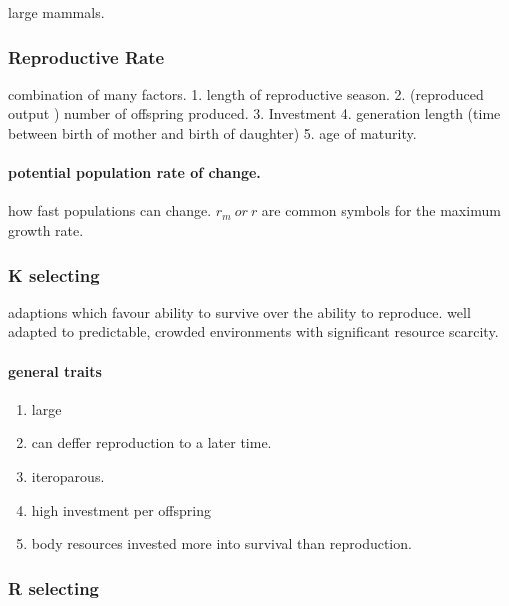 \documentclass[]{article}
\providecommand{\tightlist}{%
  \setlength{\itemsep}{0pt}\setlength{\parskip}{0pt}}
\let\oldparagraph\paragraph
\renewcommand{\paragraph}[1]{\oldparagraph{#1}\mbox{}}
\begin{document}
large mammals.

\hypertarget{reproductive-rate}{%
\subsubsection{Reproductive Rate}\label{reproductive-rate}}

combination of many factors. 1. length of reproductive season. 2.
(reproduced output ) number of offspring produced. 3. Investment 4.
generation length (time between birth of mother and birth of daughter)
5. age of maturity.

\hypertarget{potential-population-rate-of-change.}{%
\paragraph{potential population rate of
change.}\label{potential-population-rate-of-change.}}

how fast populations can change. \(r_{m} ~or~ r\) are common symbols for
the maximum growth rate.

\hypertarget{k-selecting}{%
\subsubsection{K selecting}\label{k-selecting}}

adaptions which favour ability to survive over the ability to reproduce.
well adapted to predictable, crowded environments with significant
resource scarcity.

\hypertarget{general-traits}{%
\paragraph{general traits}\label{general-traits}}

\begin{enumerate}
\def\labelenumi{\arabic{enumi}.}
\tightlist
\item
  large
\item
  can deffer reproduction to a later time.
\item
  iteroparous.
\item
  high investment per offspring
\item
  body resources invested more into survival than reproduction.
\end{enumerate}

\hypertarget{r-selecting}{%
\subsubsection{R selecting}\label{r-selecting}}
\end{document}
